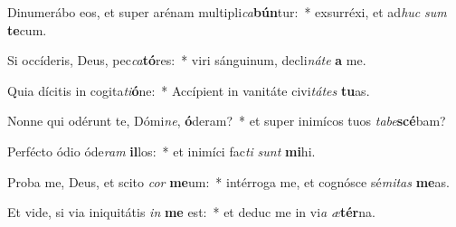 \item Dinumerábo eos, et super arénam multipli\textit{ca}\textbf{bún}tur:~* exsurréxi, et ad\textit{huc} \textit{sum} \textbf{te}cum.
\item Si occíderis, Deus, pec\textit{ca}\textbf{tó}res:~* viri sánguinum, decli\textit{ná}\textit{te} \textbf{a} me.
\item Quia dícitis in cogita\textit{ti}\textbf{ó}ne:~* Accípient in vanitáte civi\textit{tá}\textit{tes} \textbf{tu}as.
\item Nonne qui odérunt te, Dómi\textit{ne}, \textbf{ó}deram?~* et super inimícos tuos \textit{ta}\textit{be}\textbf{scé}bam?
\item Perfécto ódio óde\textit{ram} \textbf{il}los:~* et inimíci fac\textit{ti} \textit{sunt} \textbf{mi}hi.
\item Proba me, Deus, et scito \textit{cor} \textbf{me}um:~* intérroga me, et cognósce sé\textit{mi}\textit{tas} \textbf{me}as.
\item Et vide, si via iniquitátis \textit{in} \textbf{me} est:~* et deduc me in vi\textit{a} \textit{æ}\textbf{tér}na.
